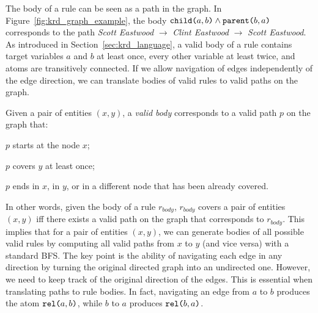 The body of a rule can be seen as a path in the graph. In Figure~\ref{fig:krd_graph_example}, the body $\texttt{child(}a,b\texttt{)} \wedge \texttt{parent(}b,a\texttt{)}$ corresponds to the path \textit{Scott Eastwood} $\rightarrow$ \textit{Clint Eastwood} $\rightarrow$ \textit{Scott Eastwood}. 
As introduced in Section~\ref{sec:krd_language}, a valid body of a rule contains target variables $a$ and $b$ at least once, every other variable at least twice, and atoms are transitively connected. 
If we allow navigation of edges independently of the edge direction, we can translate bodies of valid rules to valid paths on the graph.
\begin{inparaenum}[(i)]
	Given a pair of entities $(x,y)$, a {\em valid body} corresponds to a valid path $p$ on the graph that:
	\item $p$ starts at the node $x$;
	\item $p$ covers $y$ at least once;
	\item $p$ ends in $x$, in $y$, or in a different node that has been already covered.
\end{inparaenum}

In other words, given the body of a rule $r_{body}$, $r_{body}$ covers a pair of entities $(x,y)$ iff there exists a valid path on the graph that corresponds to $r_{body}$. This implies that for a pair of entities $(x,y)$, we can generate bodies of all possible valid rules by computing all valid paths from $x$ to $y$ (and vice versa) with a standard BFS. The key point is the ability of navigating each edge in any direction by turning the original directed graph into an undirected one.
However, we need to keep track of the original direction of the edges. This is essential when translating paths to rule bodies. In fact, %
navigating an edge from $a$ to $b$ produces the atom $\texttt{rel(}a,b\texttt{)}$, while $b$ to $a$ produces $\texttt{rel(}b,a\texttt{)}$. 

